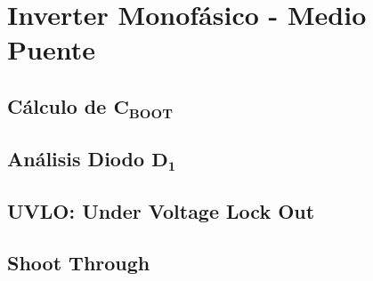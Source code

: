 \documentclass[e4_tp3_main.tex]{subfiles}
\begin{document}

\section{Inverter Monofásico - Medio Puente}

\subsection{Cálculo de $\mathbf{C_{BOOT}}$}

\subsection{Análisis Diodo $\mathbf{D_1}$}

\subsection{UVLO: Under Voltage Lock Out}

\subsection{Shoot Through}
\end{document}
